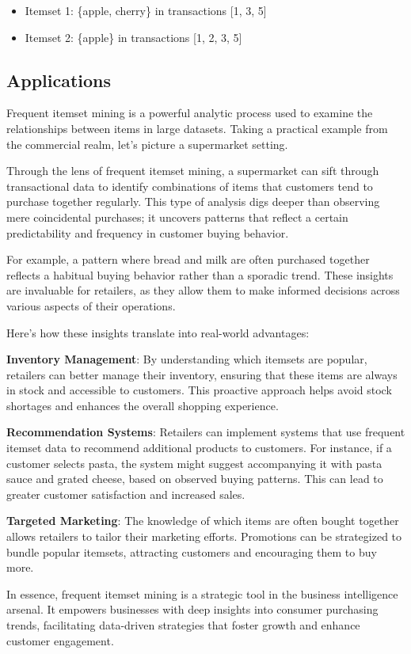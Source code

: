 \begin{itemize}
    \item Itemset 1: \{apple, cherry\} in transactions [1, 3, 5]
    \item Itemset 2: \{apple\} in transactions [1, 2, 3, 5]

\end{itemize}

\subsection{Applications}
Frequent itemset mining is a powerful analytic process used to examine the relationships between items in large datasets. Taking a practical example from the commercial realm, let's picture a supermarket setting.

Through the lens of frequent itemset mining, a supermarket can sift through transactional data to identify combinations of items that customers tend to purchase together regularly. This type of analysis digs deeper than observing mere coincidental purchases; it uncovers patterns that reflect a certain predictability and frequency in customer buying behavior.

For example, a pattern where bread and milk are often purchased together reflects a habitual buying behavior rather than a sporadic trend. These insights are invaluable for retailers, as they allow them to make informed decisions across various aspects of their operations.

Here's how these insights translate into real-world advantages:

\textbf{Inventory Management}: By understanding which itemsets are popular, retailers can better manage their inventory, ensuring that these items are always in stock and accessible to customers. This proactive approach helps avoid stock shortages and enhances the overall shopping experience.

\textbf{Recommendation Systems}: Retailers can implement systems that use frequent itemset data to recommend additional products to customers. For instance, if a customer selects pasta, the system might suggest accompanying it with pasta sauce and grated cheese, based on observed buying patterns. This can lead to greater customer satisfaction and increased sales.

\textbf{Targeted Marketing}: The knowledge of which items are often bought together allows retailers to tailor their marketing efforts. Promotions can be strategized to bundle popular itemsets, attracting customers and encouraging them to buy more.

In essence, frequent itemset mining is a strategic tool in the business intelligence arsenal. It empowers businesses with deep insights into consumer purchasing trends, facilitating data-driven strategies that foster growth and enhance customer engagement.
